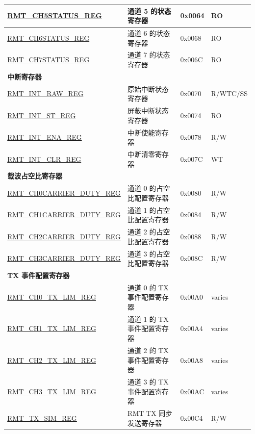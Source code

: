 \begin{longtable}{ | p{5.5cm} | p{6.5cm} | p{1.3cm} | p{1.8cm} | }
\hyperref[regdesc:RMTCHMSTATUSREG]{RMT\_CH5STATUS\_REG} & 通道 5 的状态寄存器 & 0x0064 & RO \\ \hline
\hyperref[regdesc:RMTCHMSTATUSREG]{RMT\_CH6STATUS\_REG} & 通道 6 的状态寄存器 & 0x0068 & RO \\ \hline
\hyperref[regdesc:RMTCHMSTATUSREG]{RMT\_CH7STATUS\_REG} & 通道 7 的状态寄存器 & 0x006C & RO \\ \hline
\multicolumn{4}{|l|}{\textbf{中断寄存器}} \\ \hline
\hyperref[regdesc:RMTINTRAWREG]{RMT\_INT\_RAW\_REG} & 原始中断状态寄存器 & 0x0070 & R/WTC/SS \\ \hline
\hyperref[regdesc:RMTINTSTREG]{RMT\_INT\_ST\_REG} & 屏蔽中断状态寄存器 & 0x0074 & RO \\ \hline
\hyperref[regdesc:RMTINTENAREG]{RMT\_INT\_ENA\_REG} &  中断使能寄存器 & 0x0078 & R/W \\ \hline
\hyperref[regdesc:RMTINTCLRREG]{RMT\_INT\_CLR\_REG} & 中断清零寄存器 & 0x007C & WT \\ \hline
\multicolumn{4}{|l|}{\textbf{载波占空比寄存器}} \\ \hline
\hyperref[regdesc:RMTCHNCARRIERDUTYREG]{RMT\_CH0CARRIER\_DUTY\_REG} & 通道 0 的占空比配置寄存器 & 0x0080 & R/W \\ \hline
\hyperref[regdesc:RMTCHNCARRIERDUTYREG]{RMT\_CH1CARRIER\_DUTY\_REG} & 通道 1 的占空比配置寄存器 & 0x0084 & R/W \\ \hline
\hyperref[regdesc:RMTCHNCARRIERDUTYREG]{RMT\_CH2CARRIER\_DUTY\_REG} & 通道 2 的占空比配置寄存器 & 0x0088 & R/W \\ \hline
\hyperref[regdesc:RMTCHNCARRIERDUTYREG]{RMT\_CH3CARRIER\_DUTY\_REG} & 通道 3 的占空比配置寄存器 & 0x008C & R/W \\ \hline
\multicolumn{4}{|l|}{\textbf{TX 事件配置寄存器}} \\ \hline
\hyperref[regdesc:RMTCHNTXLIMREG]{RMT\_CH0\_TX\_LIM\_REG} & 通道 0 的 TX 事件配置寄存器 & 0x00A0 & varies \\ \hline
\hyperref[regdesc:RMTCHNTXLIMREG]{RMT\_CH1\_TX\_LIM\_REG} & 通道 1 的 TX 事件配置寄存器 & 0x00A4 & varies \\ \hline
\hyperref[regdesc:RMTCHNTXLIMREG]{RMT\_CH2\_TX\_LIM\_REG} & 通道 2 的 TX 事件配置寄存器 & 0x00A8 & varies \\ \hline
\hyperref[regdesc:RMTCHNTXLIMREG]{RMT\_CH3\_TX\_LIM\_REG} & 通道 3 的 TX 事件配置寄存器 & 0x00AC & varies \\ \hline
\hyperref[regdesc:RMTTXSIMREG]{RMT\_TX\_SIM\_REG} & RMT TX 同步发送寄存器 & 0x00C4 & R/W \\ \hline

\end{longtable}
